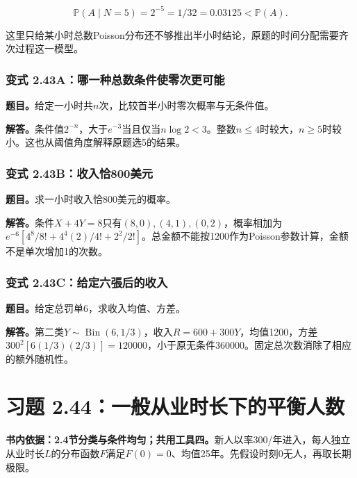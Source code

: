 \documentclass[12pt,a4paper,UTF8,fontset=fandol]{ctexart}
\begin{document}
\[\boxed{\mathbb P(A\mid N=5)=2^{-5}=1/32=0.03125<\mathbb P(A).}\]

这里只给某小时总数Poisson分布还不够推出半小时结论，原题的时间分配需要齐次过程这一模型。

\subsubsection{变式
2.43A：哪一种总数条件使零次更可能}\label{ux53d8ux5f0f-2.43aux54eaux4e00ux79cdux603bux6570ux6761ux4ef6ux4f7fux96f6ux6b21ux66f4ux53efux80fd}

\textbf{题目。}给定一小时共\(n\)次，比较首半小时零次概率与无条件值。

\textbf{解答。}条件值\(2^{-n}\)，大于\(e^{-3}\)当且仅当\(n\log2<3\)。整数\(n\le4\)时较大，\(n\ge5\)时较小。这也从阈值角度解释原题选5的结果。

\subsubsection{变式
2.43B：收入恰800美元}\label{ux53d8ux5f0f-2.43bux6536ux5165ux6070800ux7f8eux5143}

\textbf{题目。}求一小时收入恰800美元的概率。

\textbf{解答。}条件\(X+4Y=8\)只有\((8,0),(4,1),(0,2)\)，概率相加为\(e^{-6}[4^8/8!+4^4(2)/4!+2^2/2!]\)。总金额不能按1200作为Poisson参数计算，金额不是单次增加1的次数。

\subsubsection{变式
2.43C：给定六張后的收入}\label{ux53d8ux5f0f-2.43cux7ed9ux5b9aux516dux5f35ux540eux7684ux6536ux5165}

\textbf{题目。}给定总罚单6，求收入均值、方差。

\textbf{解答。}第二类\(Y\sim\operatorname{Bin}(6,1/3)\)，收入\(R=600+300Y\)，均值1200，方差\(300^2[6(1/3)(2/3)]=120000\)，小于原无条件360000。固定总次数消除了相应的额外随机性。

\section{习题
2.44：一般从业时长下的平衡人数}\label{ux4e60ux9898-2.44ux4e00ux822cux4eceux4e1aux65f6ux957fux4e0bux7684ux5e73ux8861ux4ebaux6570}

\textbf{书内依据：2.4节分类与条件均匀；共用工具四。}新人以率300/年进入，每人独立从业时长\(L\)的分布函数\(F\)满足\(F(0)=0\)、均值25年。先假设时刻0无人，再取长期极限。
\end{document}
